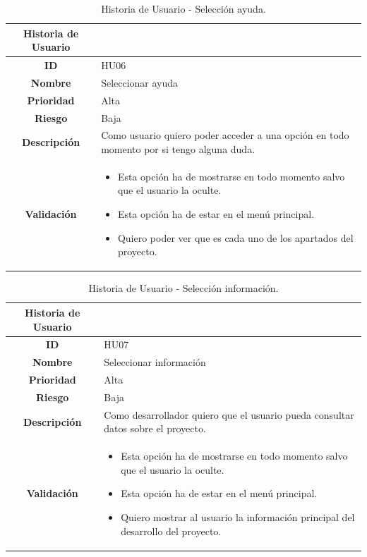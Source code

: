 \begin{table}[H]
	\begin{center}
		\begin{tabular}{| c | p{9cm} |}
			\hline
			
			Historia de Usuario &  \\ \hline
			
			
			\textbf{ID} & HU06 \\
			\textbf{Nombre} & Seleccionar ayuda \\
			\textbf{Prioridad} & Alta \\
			\textbf{Riesgo} & Baja \\
			\textbf{Descripción} & Como usuario quiero poder acceder a una opción en todo momento por si tengo alguna duda. \\
			\textbf{Validación} & \begin{itemize}
				\item Esta opción ha de mostrarse en todo momento salvo que el usuario la oculte.
				\item Esta opción ha de estar en el menú principal.
				\item Quiero poder ver que es cada uno de los apartados del proyecto.
			\end{itemize} \\ \hline
		\end{tabular}
		\caption{Historia de Usuario - Selección ayuda.}
	\end{center}
\end{table}

\begin{table}[H]
	\begin{center}
		\begin{tabular}{| c | p{9cm} |}
			\hline
			
			Historia de Usuario &  \\ \hline
			
			
			\textbf{ID} & HU07 \\
			\textbf{Nombre} & Seleccionar información \\
			\textbf{Prioridad} & Alta \\
			\textbf{Riesgo} & Baja \\
			\textbf{Descripción} & Como desarrollador quiero que el usuario pueda consultar datos sobre el proyecto. \\
			\textbf{Validación} & \begin{itemize}
				\item Esta opción ha de mostrarse en todo momento salvo que el usuario la oculte.
				\item Esta opción ha de estar en el menú principal.
				\item Quiero mostrar al usuario la información principal del desarrollo del proyecto.
			\end{itemize} \\ \hline
		\end{tabular}
		\caption{Historia de Usuario - Selección información.}
	\end{center}
\end{table}

